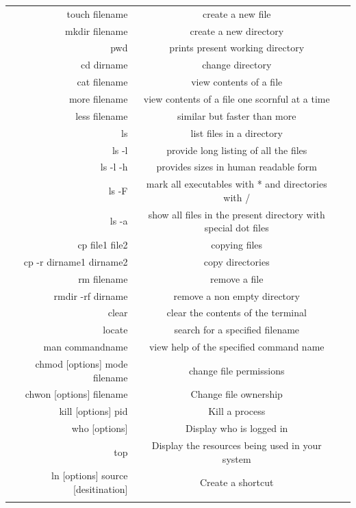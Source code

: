 \documentclass{article}
\begin{document}
\begin{table}[htb]
\begin{tabular}{rcc}
\hline
touch filename        	& create a new file\\
mkdir filename			&create a new directory\\
pwd						&prints present working directory\\
cd dirname				&change directory\\
\hline
cat filename	&view contents of a file\\
more filename	&view contents of a file one scornful at a time\\
less filename 	&similar but faster than more\\
\hline
ls				&list files in a directory\\
ls -l 			&provide long listing of all the files\\
ls -l -h		&provides sizes in human readable form\\
ls -F			&mark all executables with * and directories with / \\
ls -a			&show all files in the present directory with special dot files\\
\hline
cp file1 file2			&copying files\\
cp -r dirname1 dirname2	&copy directories\\
\hline
rm filename			&remove a file\\
rmdir -rf dirname	&remove a non empty directory\\
\hline
clear			&clear the contents of the terminal\\
locate			&search for a specified filename\\
man commandname	&view help of the specified command name\\
\hline
chmod [options] mode filename &change file permissions\\
chwon [options] filename &Change file ownership\\
kill [options] pid &Kill a process\\
who [options] &Display who is logged in\\
top &Display the resources being used in your system\\
ln [options] source [desitination] &Create a shortcut\\
\noalign{\smallskip} \hline \noalign{\smallskip}
\end{tabular}
\end{table}

\newpage
\end{document}
